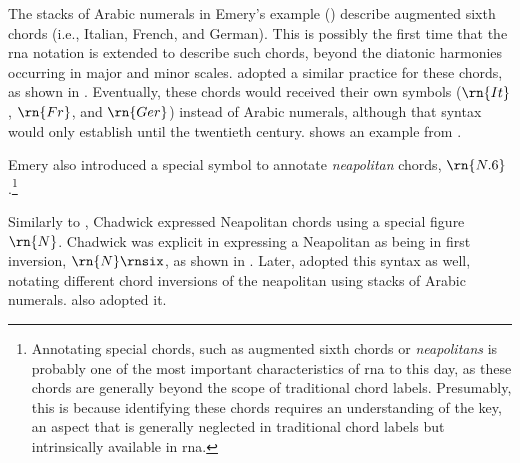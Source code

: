 


The stacks of Arabic numerals in Emery's example
() describe
augmented sixth chords (i.e., Italian, French, and German).
This is possibly the first time that the \gls{rna} notation
is extended to describe such chords, beyond the diatonic
harmonies occurring in major and minor scales.
\textcite{shepard1896harmony} adopted a similar practice for
these chords, as shown in
. Eventually,
these chords would received their own symbols ($\rn{It}$,
$\rn{Fr}$, and $\rn{Ger}$) instead of Arabic numerals,
although that syntax would only establish until the
twentieth century.
 shows an
example from \textcite{goldman1965harmony}.



Emery also introduced a special symbol to annotate
\emph{neapolitan} chords, $\rn{N.6}$.\footnote{Annotating
special chords, such as augmented sixth chords or
\emph{neapolitans} is probably one of the most important
characteristics of \gls{rna} to this day, as these chords
are generally beyond the scope of traditional chord labels.
Presumably, this is because identifying these chords
requires an understanding of the key, an aspect that is
generally neglected in traditional chord labels but
intrinsically available in \gls{rna}.}

Similarly to \textcite{emery1879elements}, Chadwick
expressed Neapolitan chords using a special figure $\rn{N}$.
Chadwick was explicit in expressing a Neapolitan as being in
first inversion, $\rn{N}\rnsix$, as shown in
. Later,
\textcite{heacox1907lessons} adopted this syntax as well,
notating different chord inversions of the neapolitan using
stacks of Arabic numerals. \textcite{alchin1921applied} also
adopted it.



